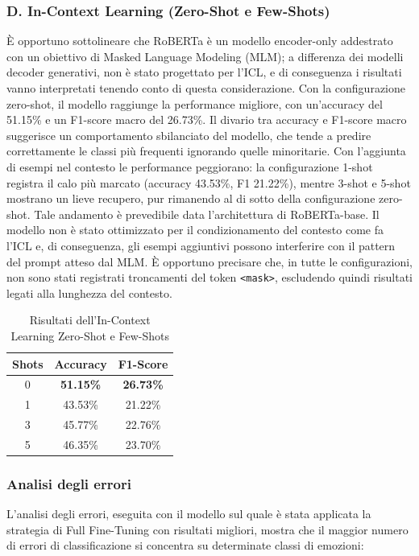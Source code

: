 \documentclass[a4paper,12pt]{article}
\begin{document}
\subsubsection*{D. In-Context Learning (Zero-Shot e Few-Shots)}
È opportuno sottolineare che RoBERTa è un modello encoder-only addestrato con un obiettivo di Masked Language Modeling (MLM); a differenza dei modelli decoder generativi, non è stato progettato per l'ICL, e di conseguenza i risultati vanno interpretati tenendo conto di questa considerazione.
Con la configurazione zero-shot, il modello raggiunge la performance migliore, con un'accuracy del 51.15\% e un F1-score macro del 26.73\%. Il divario tra accuracy e F1-score macro suggerisce un comportamento sbilanciato del modello, che tende a predire correttamente le classi più frequenti ignorando quelle minoritarie. Con l'aggiunta di esempi nel contesto le performance peggiorano: la configurazione 1-shot registra il calo più marcato (accuracy 43.53\%, F1 21.22\%), mentre 3-shot e 5-shot mostrano un lieve recupero, pur rimanendo al di sotto della configurazione zero-shot. Tale andamento è prevedibile data l'architettura di RoBERTa-base.
Il modello non è stato ottimizzato per il condizionamento del contesto come fa l'ICL e, di conseguenza, gli esempi aggiuntivi possono interferire con il pattern del prompt atteso dal MLM. È opportuno precisare che, in tutte le configurazioni, non sono stati registrati troncamenti del token \texttt{<mask>}, escludendo quindi risultati legati alla lunghezza del contesto.

\begin{table}[H]
    \centering
    \begin{tabular}{|c|c|c|}
        \hline
        \textbf{Shots} & \textbf{Accuracy} & \textbf{F1-Score} \\
        \hline
        0              & \textbf{51.15\%}  & \textbf{26.73\% } \\
        1              & 43.53\%           & 21.22\%           \\
        3              & 45.77\%           & 22.76\%           \\
        5              & 46.35\%           & 23.70\%           \\
        \hline
    \end{tabular}
    \caption{Risultati dell'In-Context Learning Zero-Shot e Few-Shots}
\end{table}

\subsubsection{Analisi degli errori}
L'analisi degli errori, eseguita con il modello sul quale è stata applicata la strategia di Full Fine-Tuning con risultati migliori, mostra che il maggior numero di errori di classificazione si concentra su determinate classi di emozioni:
\end{document}

